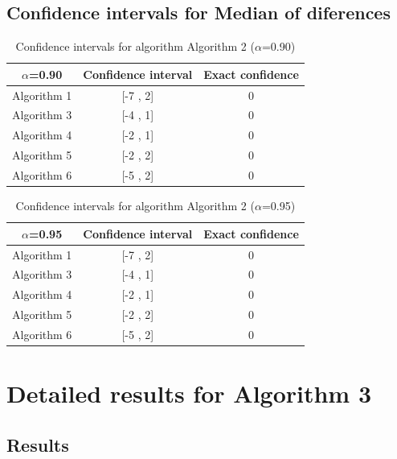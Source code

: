 \documentclass[a4paper,10pt]{article}
\begin{document}
\subsection{Confidence intervals for Median of diferences}

\begin{table}[!htp]
\centering\small
\begin{tabular}{
|c|c|c|}
\hline
 $\alpha$=0.90 & Confidence interval & Exact confidence \\ \hline 
Algorithm 1 & [-7 , 2] & 0\\ \hline 
Algorithm 3 & [-4 , 1] & 0\\ \hline 
Algorithm 4 & [-2 , 1] & 0\\ \hline 
Algorithm 5 & [-2 , 2] & 0\\ \hline 
Algorithm 6 & [-5 , 2] & 0\\ \hline 

\end{tabular}
\caption{Confidence intervals for algorithm Algorithm 2 ($\alpha$=0.90)}
\end{table}
\begin{table}[!htp]
\centering\small
\begin{tabular}{
|c|c|c|}
\hline
 $\alpha$=0.95 & Confidence interval & Exact confidence \\ \hline 
Algorithm 1 & [-7 , 2] & 0\\ \hline 
Algorithm 3 & [-4 , 1] & 0\\ \hline 
Algorithm 4 & [-2 , 1] & 0\\ \hline 
Algorithm 5 & [-2 , 2] & 0\\ \hline 
Algorithm 6 & [-5 , 2] & 0\\ \hline 

\end{tabular}
\caption{Confidence intervals for algorithm Algorithm 2 ($\alpha$=0.95)}
\end{table}

 \clearpage 


\section{Detailed results for Algorithm 3}


\subsection{Results}
\end{document}
